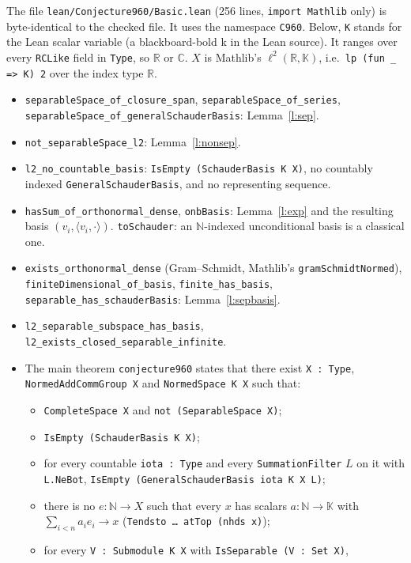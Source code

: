 \documentclass[11pt]{article}
\theoremstyle{definition}
\newcommand{\K}{\mathbb{K}}
\newcommand{\ip}[2]{\langle #1,#2\rangle}
\begin{document}
The file \texttt{lean/Conjecture960/Basic.lean} (256 lines, \texttt{import Mathlib} only) is
byte-identical to the checked file. It uses the namespace \texttt{C960}. Below, \texttt{K}
stands for the Lean scalar variable (a blackboard-bold k in the Lean source). It ranges over
every \texttt{RCLike} field in \texttt{Type}, so $\mathbb{R}$ or $\mathbb{C}$. $X$ is Mathlib's
$\ell^2(\mathbb{R},\K)$, i.e.\ \texttt{lp (fun \_ => K) 2} over the index type $\mathbb{R}$.
\begin{itemize}
\item \texttt{separableSpace\_of\_closure\_span}, \texttt{separableSpace\_of\_series},
\texttt{separableSpace\_of\_generalSchauderBasis}: Lemma~\ref{l:sep}.
\item \texttt{not\_separableSpace\_l2}: Lemma~\ref{l:nonsep}.
\item \texttt{l2\_no\_countable\_basis}: \texttt{IsEmpty (SchauderBasis K X)}, no countably
indexed \texttt{GeneralSchauderBasis}, and no representing sequence.
\item \texttt{hasSum\_of\_orthonormal\_dense}, \texttt{onbBasis}: Lemma~\ref{l:exp} and the
resulting basis $(v_i,\ip{v_i}{\cdot})$. \texttt{toSchauder}: an $\mathbb{N}$-indexed
unconditional basis is a classical one.
\item \texttt{exists\_orthonormal\_dense} (Gram--Schmidt, Mathlib's \texttt{gramSchmidtNormed}),
\texttt{finiteDimensional\_of\_basis}, \texttt{finite\_has\_basis},
\texttt{separable\_has\_schauderBasis}: Lemma~\ref{l:sepbasis}.
\item \texttt{l2\_separable\_subspace\_has\_basis}, \texttt{l2\_exists\_closed\_separable\_infinite}.
\item The main theorem \texttt{conjecture960} states that there exist \texttt{X : Type},
\texttt{NormedAddCommGroup X} and \texttt{NormedSpace K X} such that:
  \begin{itemize}
  \item \texttt{CompleteSpace X} and \texttt{not (SeparableSpace X)};
  \item \texttt{IsEmpty (SchauderBasis K X)};
  \item for every countable \texttt{iota : Type} and every \texttt{SummationFilter} $L$ on it with
  \texttt{L.NeBot}, \texttt{IsEmpty (GeneralSchauderBasis iota K X L)};
  \item there is no $e:\mathbb{N}\to X$ such that every $x$ has scalars $a:\mathbb{N}\to\K$ with
  $\sum_{i<n}a_ie_i\to x$ (\texttt{Tendsto \ldots\ atTop (nhds x)});
  \item for every \texttt{V : Submodule K X} with \texttt{IsSeparable (V : Set X)},

\end{itemize}
\end{itemize}
\end{document}
